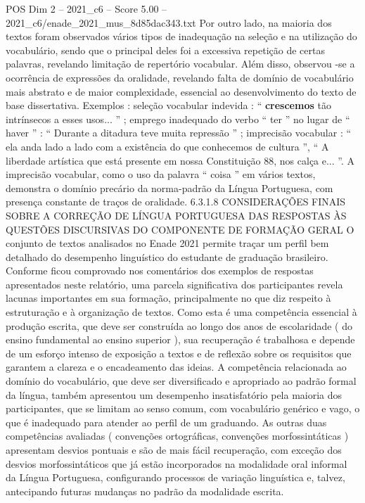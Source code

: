 \begin{textsample}{POS Dim 2 – 2021\_c6 – Score 5.00 – 2021\_c6/enade\_2021\_mus\_8d85dac343.txt}
Por outro lado, na maioria dos textos foram observados vários tipos de inadequação na seleção e na utilização do vocabulário, sendo que o principal deles foi a excessiva repetição de certas palavras, revelando limitação de repertório vocabular.
Além disso, observou -se a ocorrência de expressões da oralidade, revelando falta de domínio de vocabulário mais abstrato e de maior complexidade, essencial ao desenvolvimento do texto de base dissertativa.
Exemplos : seleção vocabular indevida : “ \textbf{crescemos} tão intrínsecos a esses usos... ” ; emprego inadequado do verbo “ ter ” no lugar de “ haver ” : “ Durante a ditadura teve muita repressão ” ; imprecisão vocabular : “ ela anda lado a lado com a existência do que conhecemos de cultura ”, “ A liberdade artística que está presente em nossa Constituição 88, nos calça e... ”.
A imprecisão vocabular, como o uso da palavra “ coisa ” em vários textos, demonstra o domínio precário da norma-padrão da Língua Portuguesa, com presença constante de traços de oralidade. 6.3.1.8 CONSIDERAÇÕES FINAIS SOBRE A CORREÇÃO DE LÍNGUA PORTUGUESA DAS RESPOSTAS ÀS QUESTÕES DISCURSIVAS DO COMPONENTE DE FORMAÇÃO GERAL O conjunto de textos analisados no Enade 2021 permite traçar um perfil bem detalhado do desempenho linguístico do estudante de graduação brasileiro.
Conforme ficou comprovado nos comentários dos exemplos de respostas apresentados neste relatório, uma parcela significativa dos participantes revela lacunas importantes em sua formação, principalmente no que diz respeito à estruturação e à organização de textos.
Como esta é uma competência essencial à produção escrita, que deve ser construída ao longo dos anos de escolaridade ( do ensino fundamental ao ensino superior ), sua recuperação é trabalhosa e depende de um esforço intenso de exposição a textos e de reflexão sobre os requisitos que garantem a clareza e o encadeamento das ideias.
A competência relacionada ao domínio do vocabulário, que deve ser diversificado e apropriado ao padrão formal da língua, também apresentou um desempenho insatisfatório pela maioria dos participantes, que se limitam ao senso comum, com vocabulário genérico e vago, o que é inadequado para atender ao perfil de um graduando.
As outras duas competências avaliadas ( convenções ortográficas, convenções morfossintáticas ) apresentam desvios pontuais e são de mais fácil recuperação, com exceção dos desvios morfossintáticos que já estão incorporados na modalidade oral informal da Língua Portuguesa, configurando processos de variação linguística e, talvez, antecipando futuras mudanças no padrão da modalidade escrita.

\end{textsample}
